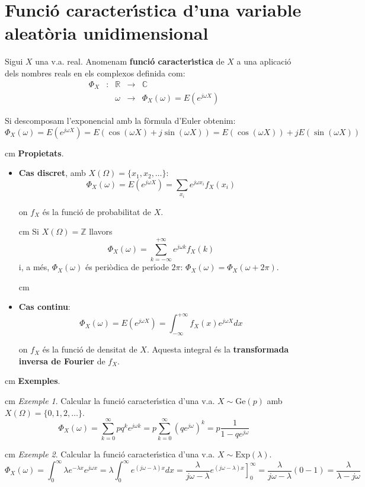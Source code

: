 \documentclass{article}
\def\Z{\mathbb Z}
\def\R{\mathbb R}
\def\C{\mathbb C}
\begin{document}
\section*{Funci\'o caracter\'\i stica d'una variable aleat\`oria unidimensional}

Sigui $X$ una v.a. real. Anomenam {\bf funci\'o caracter\'\i stica} de $X$ a una aplicaci\'o 
dels nombres reals en els complexos definida com:
\[
\begin{array}{ccrcl}
\Phi_X & : & \R & \longrightarrow & \C\\
       &   & \omega & \longrightarrow & \Phi_X(\omega)=E(e^{j \omega X})
\end{array}
\]

Si descomposam l'exponencial amb la f\`ormula d'Euler obtenim:
\[
\Phi_X(\omega)=E(e^{j \omega X})=E(\cos(\omega X) + j \sin(\omega X))=E(\cos(\omega X))+j E(\sin(\omega X))
\]

 cm
\noindent
{\bf Propietats}.
\begin{itemize}
\item {\bf Cas discret}, amb $X(\Omega)=\{x_1, x_2, \dots \}$:
\[
\Phi_X(\omega)=E(e^{j \omega X})=\sum_{x_i} e^{j \omega x_i} f_X(x_i)
\]

on $f_X$ \'es la funci\'o de probabilitat de $X$.

 cm
Si $X(\Omega)=\Z$ llavors 
\[
\Phi_X(\omega)=\sum_{k=-\infty}^{+\infty} e^{j \omega k} f_X(k)
\]
i, a m\'es, $\Phi_X(\omega)$ \'es peri\`odica de per\'\i ode $2\pi$: $\Phi_X(\omega)=\Phi_X(\omega+2\pi)$.
 
 cm

\item {\bf Cas continu}:
\[
\Phi_X(\omega)=E(e^{j \omega X})=\int_{-\infty}^{+\infty} f_X(x) e^{j \omega X} dx
\]

on $f_X$ \'es la funci\'o de densitat de $X$. Aquesta integral \'es la {\bf transformada inversa
de Fourier} de $f_X$.

\end{itemize}

 cm
\noindent
{\bf Exemples}.

 cm
\noindent
{\it Exemple 1}. Calcular la funci\'o caracter\'\i stica d'una v.a. $X \sim \mathrm{Ge}(p)$
amb $X(\Omega)=\{0, 1, 2, \dots \}$.
\[
\Phi_X(\omega)=\sum_{k=0}^\infty p q^k e^{j \omega k}=p \sum_{k=0}^\infty (q e^{j\omega})^k=
p \frac{1}{1-q e^{j\omega}}
\]

 cm
\noindent
{\it Exemple 2}. Calcular la funci\'o caracter\'\i stica d'una v.a. $X \sim \mathrm{Exp}(\lambda)$.
\[
\Phi_X(\omega)=\int_0^\infty \lambda e^{-\lambda x} e^{j\omega x}=
\lambda \int_0^\infty e^{(j \omega - \lambda) x} dx=
\frac{\lambda}{j \omega - \lambda} \left. e^{(j \omega - \lambda) x} \right]_0^\infty =
\frac{\lambda}{j \omega - \lambda} (0-1)=\frac{\lambda}{\lambda - j \omega}
\]
\end{document}
